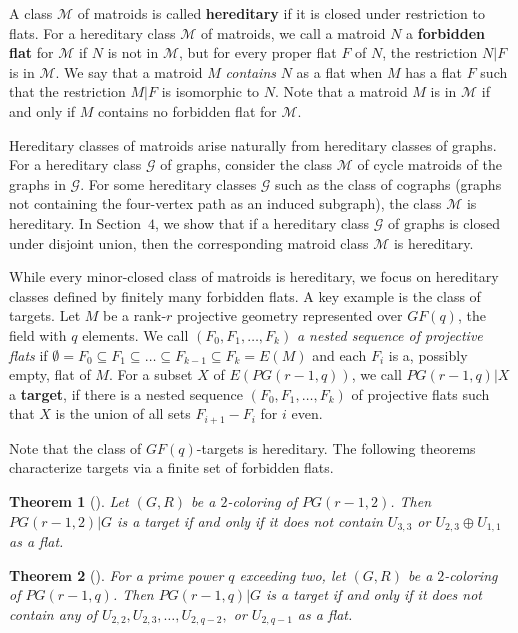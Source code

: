 \documentclass[11pt]{amsart}
\newtheorem{theorem}{Theorem}[section]
\theoremstyle{definition}
\theoremstyle{remark}
\numberwithin{equation}{section}
\begin{document}
A class $\mathcal{M}$ of matroids is called {\bf hereditary} if it is closed under restriction to flats. For a hereditary class $\mathcal{M}$ of matroids, we call a matroid $N$ a {\bf forbidden flat} for $\mathcal{M}$ if $N$ is not in $\mathcal{M}$, but for every proper flat $F$ of $N$, the restriction $N|F$ is in $\mathcal{M}$. We say that a matroid $M$ {\it contains} $N$ as a flat when $M$ has a flat $F$ such that the restriction $M|F$ is isomorphic to $N$. Note that a matroid $M$ is in $\mathcal{M}$ if and only if $M$ contains no forbidden flat for $\mathcal{M}$. 

Hereditary classes of matroids arise naturally from hereditary classes of graphs. For a hereditary class $\mathcal{G}$ of graphs, consider the class $\mathcal{M}$ of cycle matroids of the graphs in $\mathcal{G}$. For some hereditary classes $\mathcal{G}$ such as the class of cographs (graphs not containing the four-vertex path as an induced subgraph), the class $\mathcal{M}$ is hereditary. In Section~$4$, we show that if a hereditary class $\mathcal{G}$ of graphs is closed under disjoint union, then the corresponding matroid class $\mathcal{M}$ is hereditary.  

While every minor-closed class of matroids is hereditary, we focus on hereditary classes defined by finitely many forbidden flats. A key example is the class of targets. Let $M$ be a rank-$r$ projective geometry represented over $GF(q)$, the field with $q$ elements. We call $(F_0, F_1, \ldots, F_k)$ \textit {a nested sequence of projective flats} if $\emptyset = F_0 \subseteq F_1 \subseteq \ldots \subseteq F_{k-1} \subseteq F_k = E(M)$ and each $F_i$ is a, possibly empty, flat of $M$. For a subset $X$ of $E(PG(r-1,q))$, we call $PG(r-1,q)|X$ a \textbf{target}, if there is a nested sequence $(F_0, F_1, \ldots , F_k)$ of projective flats such that $X$ is the union of all sets $F_{i+1} - F_i$ for $i$ even.

Note that the class of $GF(q)$-targets is hereditary. The following theorems characterize targets via a finite set of forbidden flats. 

\begin{theorem}[\cite{nelson}]
\label{nelson_nomoto}
Let $(G,R)$ be a $2$-coloring of $PG(r-1,2)$.  Then $PG(r-1,2)|G$ is a target if and only if it does not contain $U_{3,3}$ or $U_{2,3} \oplus U_{1,1}$ as a flat.
\end{theorem}

\begin{theorem}[\cite{ox1}]
\label{mizzel}
For a prime power $q$ exceeding two, let $(G,R)$ be a $2$-coloring of $PG(r-1,q)$.  Then $PG(r-1,q)|G$ is a target if and only if it does not contain any of $U_{2,2}, U_{2,3}, \ldots, U_{2,q-2},$ or $U_{2,q-1}$ as a flat.
\end{theorem}
\end{document}
